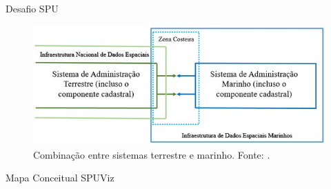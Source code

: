 \documentclass[9pt,ignorenonframetext,]{beamer}
\newif\ifbibliography
\begin{document}
\begin{frame}{Desafio SPU}
\protect\hypertarget{desafio-spu}{}

\begin{figure}[H]

{\centering \includegraphics[width=0.7\linewidth]{Figura-3-Combinacao-entre-os-sistemas-de-gerenciamento-terrestre-e-marinho_W640} 

}

\caption{Combinação entre sistemas terrestre e marinho. Fonte: \textcite{IDEM}.}\label{fig:unnamed-chunk-4}
\end{figure}

\end{frame}

\begin{frame}{Mapa Conceitual SPUViz}
\protect\hypertarget{mapa-conceitual-spuviz}{}

\end{frame}


  \begin{frame}[allowframebreaks]{}
  \bibliographytrue
  \printbibliography[heading=none]
  \end{frame}
\end{document}
